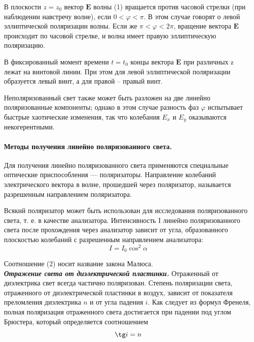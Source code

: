\documentclass[a4paper, 12pt, twoside]{article}
\begin{document}
	В плоскости $z = z_0$ вектор $\mathbf{E}$ волны (1) вращается против часовой стрелки (при наблюдении навстречу волне), если $0 < \varphi < \pi$. В этом	случае говорят о левой эллиптической поляризации волны. Если же $\pi < \varphi < 2\pi$, вращение вектора $\mathbf{E}$ происходит по часовой стрелке, и волна имеет правую эллиптическую поляризацию.
	
	В фиксированный момент времени $t = t_0$ концы вектора $\mathbf{E}$ при различных z лежат на винтовой линии. При этом для левой эллиптической поляризации образуется левый винт, а для правой -- правый винт.
	
	Неполяризованный свет также может быть разложен на две линейно поляризованные компоненты; однако в этом случае разность фаз $\varphi$ испытывает быстрые хаотические изменения, так что колебания $E_x$ и $E_y$ оказываются некогерентными.
	
	\paragraph{Методы получения линейно поляризованного света.}
	
	Для получения линейно поляризованного света применяются специальные оптические приспособления — поляризаторы. Направление колебаний электрического вектора в волне, прошедшей через поляризатор, называется	разрешенным направлением поляризатора.
	
	Всякий поляризатор может быть использован для исследования поляризованного света, т. е. в качестве анализатора. Интенсивность I линейно поляризованного света после прохождения через анализатор зависит от угла, образованного плоскостью колебаний с разрешенным направлением анализатора:
	\begin{equation}
	I = I_0 \cos^2 \alpha 
	\end{equation}
	
	Соотношение (2) носит название закона Малюса.\\
	
	\textit{\textbf{Отражение света от диэлектрической пластинки.}} Отраженный от диэлектрика свет всегда частично поляризован. Степень поляризации света, отраженного от диэлектрической пластинки в воздух, зависит от показателя преломления диэлектрика $n$ и от угла падения $i$. Как следует из формул Френеля, полная поляризация отраженного света достигается
	при падении под углом Брюстера, который определяется соотношением
	\begin{equation}
	\tg i = n 
	\end{equation}
	
\end{document}
